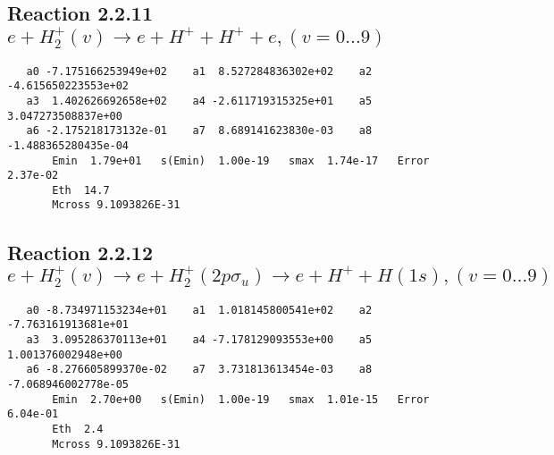 \documentclass[12pt,dvipdfm]{article}
\begin{document}
\newpage
\subsection{
Reaction 2.2.11 $e + H_2^+(v) \rightarrow e + H^+ + H^+ + e, (v=0\ldots 9)$}














\begin{small}\begin{verbatim}
   a0 -7.175166253949e+02    a1  8.527284836302e+02    a2 -4.615650223553e+02
   a3  1.402626692658e+02    a4 -2.611719315325e+01    a5  3.047273508837e+00
   a6 -2.175218173132e-01    a7  8.689141623830e-03    a8 -1.488365280435e-04
       Emin  1.79e+01   s(Emin)  1.00e-19   smax  1.74e-17   Error  2.37e-02
       Eth  14.7
       Mcross 9.1093826E-31
\end{verbatim}\end{small}




\newpage
\subsection{
Reaction 2.2.12 $e + H_2^+(v) \rightarrow e + H_2^+(2p\sigma_u) \rightarrow e + H^+ + H(1s), (v=0\ldots 9)$}














\begin{small}\begin{verbatim}
   a0 -8.734971153234e+01    a1  1.018145800541e+02    a2 -7.763161913681e+01
   a3  3.095286370113e+01    a4 -7.178129093553e+00    a5  1.001376002948e+00
   a6 -8.276605899370e-02    a7  3.731813613454e-03    a8 -7.068946002778e-05
       Emin  2.70e+00   s(Emin)  1.00e-19   smax  1.01e-15   Error  6.04e-01
       Eth  2.4
       Mcross 9.1093826E-31
\end{verbatim}\end{small}
\end{document}
